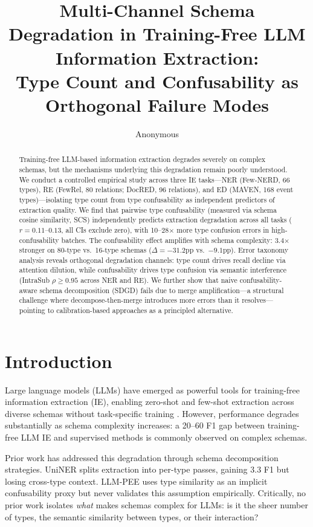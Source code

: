 \documentclass[11pt,a4paper]{article}
\title{Multi-Channel Schema Degradation in Training-Free LLM Information Extraction:\\Type Count and Confusability as Orthogonal Failure Modes}
\author{Anonymous}
\begin{document}
\maketitle

\begin{abstract}
Training-free LLM-based information extraction degrades severely on complex schemas, but the mechanisms underlying this degradation remain poorly understood.
We conduct a controlled empirical study across three IE tasks---NER (Few-NERD, 66 types), RE (FewRel, 80 relations; DocRED, 96 relations), and ED (MAVEN, 168 event types)---isolating type count from type confusability as independent predictors of extraction quality.
We find that pairwise type confusability (measured via schema cosine similarity, SCS) independently predicts extraction degradation across all tasks ($r{=}0.11$--$0.13$, all CIs exclude zero), with 10--28$\times$ more type confusion errors in high-confusability batches.
The confusability effect amplifies with schema complexity: 3.4$\times$ stronger on 80-type vs.\ 16-type schemas ($\Delta{=}{-}31.2$pp vs.\ ${-}9.1$pp).
Error taxonomy analysis reveals orthogonal degradation channels: type count drives recall decline via attention dilution, while confusability drives type confusion via semantic interference (IntraSub $\rho{\geq}0.95$ across NER and RE).
We further show that naive confusability-aware schema decomposition (SDGD) fails due to merge amplification---a structural challenge where decompose-then-merge introduces more errors than it resolves---pointing to calibration-based approaches as a principled alternative.
\end{abstract}

\section{Introduction}

Large language models (LLMs) have emerged as powerful tools for training-free information extraction (IE), enabling zero-shot and few-shot extraction across diverse schemas without task-specific training \cite{wei2023zeroshot}.
However, performance degrades substantially as schema complexity increases: a 20--60 F1 gap between training-free LLM IE and supervised methods is commonly observed on complex schemas.

Prior work has addressed this degradation through schema decomposition strategies.
UniNER \cite{zhou2024universalner} splits extraction into per-type passes, gaining 3.3 F1 but losing cross-type context.
LLM-PEE uses type similarity as an implicit confusability proxy but never validates this assumption empirically.
Critically, no prior work isolates \emph{what} makes schemas complex for LLMs: is it the sheer number of types, the semantic similarity between types, or their interaction?
\end{document}
